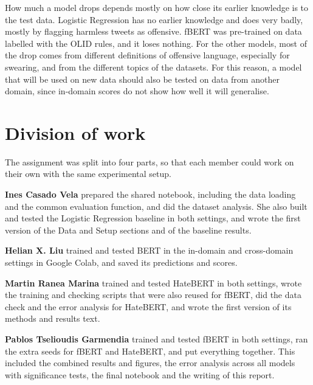 \documentclass[11pt,a4paper]{article}
\begin{document}
How much a model drops depends mostly on how close its earlier knowledge is to the test data. Logistic Regression has no earlier knowledge and does very badly, mostly by flagging harmless tweets as offensive. fBERT was pre-trained on data labelled with the OLID rules, and it loses nothing. For the other models, most of the drop comes from different definitions of offensive language, especially for swearing, and from the different topics of the datasets. For this reason, a model that will be used on new data should also be tested on data from another domain, since in-domain scores do not show how well it will generalise.




\appendix

\section{Division of work}

The assignment was split into four parts, so that each member could work on their own with the same experimental setup.

\textbf{Ines Casado Vela} prepared the shared notebook, including the data loading and the common evaluation function, and did the dataset analysis. She also built and tested the Logistic Regression baseline in both settings, and wrote the first version of the Data and Setup sections and of the baseline results.

\textbf{Helian X. Liu} trained and tested BERT in the in-domain and cross-domain settings in Google Colab, and saved its predictions and scores.

\textbf{Martin Ranea Marina} trained and tested HateBERT in both settings, wrote the training and checking scripts that were also reused for fBERT, did the data check and the error analysis for HateBERT, and wrote the first version of its methods and results text.

\textbf{Pablos Tselioudis Garmendia} trained and tested fBERT in both settings, ran the extra seeds for fBERT and HateBERT, and put everything together. This included the combined results and figures, the error analysis across all models with significance tests, the final notebook and the writing of this report.

\end{document}
